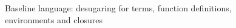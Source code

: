 \begin{figure}
   \begin{minipage}[t]{0.48\textwidth}
      {\small \flushleft {}
         \begin{smathpar}
            {
                   \desugar {}
            }
         \end{smathpar}
      }
   \end{minipage}
   \caption{Baseline language: desugaring for terms, function definitions, environments and closures}
   \label{fig:baseline:desugar}
\end{figure}
